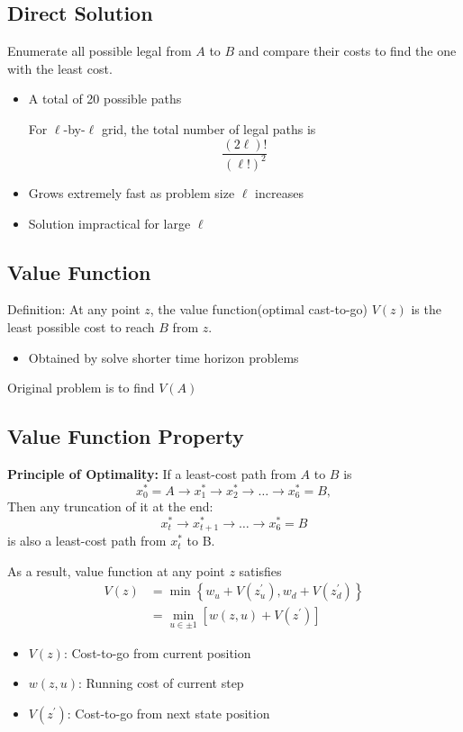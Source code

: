 \documentclass[10pt,a4paper,oneside]{article}
\begin{document}
\subsection{Direct Solution}
Enumerate all possible legal from $A$ to $B$ and compare their costs to find the one with the least cost.
\begin{itemize}
\item A total of 20 possible paths

For $\ell$-by-$\ell$ grid, the total number of legal paths is
$$
\frac{(2 \ell) !}{(\ell !)^{2}}
$$
\item Grows extremely fast as problem size $\ell$ increases
\item Solution impractical for large $\ell$
\end{itemize}
\subsection{Value Function}
Definition: At any point $z$, the value function(optimal cast-to-go) $V(z)$ is the least possible cost to reach $B$ from $z$.
\begin{itemize}
\item Obtained by solve shorter time horizon problems
\end{itemize}
Original problem is to find $V(A)$
\subsection{Value Function Property}
{\bfseries Principle of Optimality: }If a least-cost path from $A$ to $B$ is
\[
x^*_0=A\rightarrow x^*_1\rightarrow x^*_2\rightarrow\dots\rightarrow x^*_6=B,
\]
Then any truncation of it at the end:
\[
x^*_t\rightarrow x^*_{t+1}\rightarrow \dots \rightarrow x^*_6=B
\]
is also a least-cost path from $x^*_t$ to B.

\noindent As a result, value function at any point $z$ satisfies
$$
\begin{aligned} V(z) &=\min \left\{w_{u}+V\left(z_{u}^{\prime}\right), w_{d}+V\left(z_{d}^{\prime}\right)\right\} \\ &=\min _{u \in \pm 1}\left[w(z, u)+V\left(z^{\prime}\right)\right] \end{aligned}
$$
\begin{itemize}
\item $V(z)$: Cost-to-go from current position
\item $w(z,u)$: Running cost of current step
\item $V(z^{\prime})$: Cost-to-go from next state position
\end{itemize}
\end{document}
